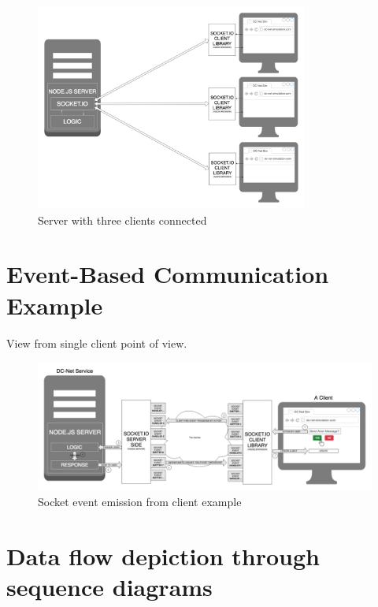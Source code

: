 \begin{figure}[H]
    \centering
    \includegraphics[width=0.8\textwidth]{Images/Design/distributedArchitecture.png}
    \caption{Server with three clients connected}
    \label{fig:distrubtedArchitecture}
\end{figure}


\section{Event-Based Communication Example}
View from single client point of view.

\begin{figure}[H]
    \centering
    \includegraphics[width=1\textwidth]{Images/Design/singleClientSocketEvent.png}
    \caption{Socket event emission from client example}
    \label{fig:socketEventEmission}
\end{figure}



\section{Data flow depiction through sequence diagrams}


